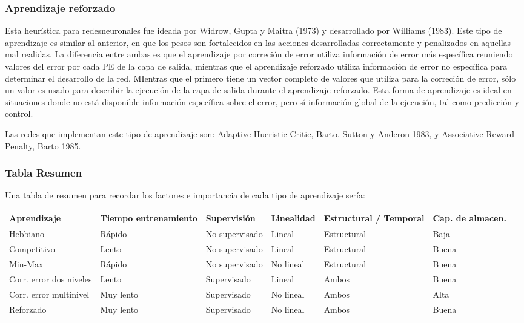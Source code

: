 \subsubsection{Aprendizaje reforzado}

Esta heurística para redesneuronales fue ideada por Widrow, Gupta y Maitra (1973) y desarrollado por Williams (1983). Este tipo de aprendizaje es similar al anterior, en que los pesos
son fortalecidos en las acciones desarrolladas correctamente y penalizados en aquellas mal realidas. La diferencia entre ambas es que el aprendizaje por correción de error utiliza
información de error más específica reuniendo valores del error por cada PE de la capa de salida, mientras que el aprendizaje reforzado utiliza información de error no específica
para determinar el desarrollo de la red. MIentras que el primero tiene un vector completo de valores que utiliza para la correción de error, sólo un valor es usado para describir la ejecución de la capa
de salida durante el aprendizaje reforzado. Esta forma de aprendizaje es ideal en situaciones donde no está disponible información específica sobre el error, pero sí información global de la ejecución,
tal como predicción y control.

Las redes que implementan este tipo de aprendizaje son: Adaptive Hueristic Critic, Barto, Sutton y Anderon 1983, y Associative Reward-Penalty, Barto 1985.

\subsubsection{Tabla Resumen}

Una tabla de resumen para recordar los factores e importancia de cada tipo de aprendizaje sería:

\begin{tabularx}{\textwidth}{|X|X|X|X|X|X|}
	\hline 
	Aprendizaje	& Tiempo entrenamiento	& Supervisión			& Linealidad	& Estructural / Temporal	& Cap. de almacen. \\
	\hline 
	Hebbiano 	& Rápido		& No supervisado		& Lineal	& Estructural			& Baja	\\
	Competitivo	& Lento			& No supervisado		& Lineal	& Estructural			& Buena	\\
	Min-Max		& Rápido		& No supervisado		& No lineal	& Estructural			& Buena	\\
	Corr. error dos niveles & Lento		& Supervisado			& Lineal	& Ambos				& Buena	\\
	Corr. error multinivel & Muy lento	& Supervisado			& No lineal	& Ambos				& Alta	\\
	Reforzado	& Muy lento		& Supervisado			& No lineal	& Ambos				& Buena \\
	\hline 	
\end{tabularx}


















